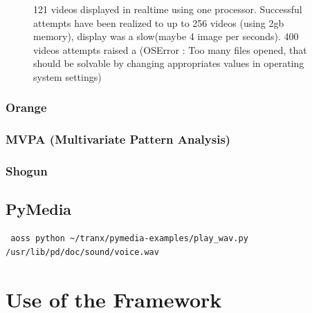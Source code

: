 \documentclass{report}
\begin{document}
\begin{figure}[h!]

\caption{121 videos displayed in realtime using one processor. Successful attempts have been realized to up to 256 videos (using 2gb memory), display was
a slow(maybe 4 image per seconds). 400 videos attempts raised a (OSError : Too many files opened, that should be solvable by changing appropriates 
values in operating system settings)}
\end{figure}






\subsection{Orange}






\subsection{MVPA (Multivariate Pattern Analysis)}






\subsection{Shogun}






\section{PyMedia}
\begin{verbatim}
 aoss python ~/tranx/pymedia-examples/play_wav.py /usr/lib/pd/doc/sound/voice.wav

\end{verbatim}














\chapter{Use of the Framework}
\end{document}
